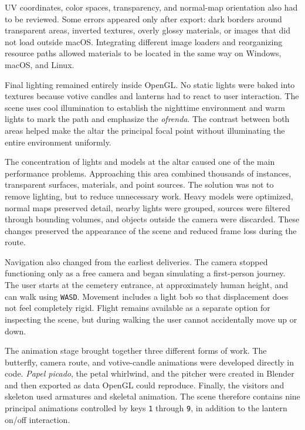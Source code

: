 \documentclass[letter,12pt]{article}
\begin{document}
	UV coordinates, color spaces, transparency, and normal-map orientation also had to be reviewed. Some errors appeared only after export: dark borders around transparent areas, inverted textures, overly glossy materials, or images that did not load outside macOS. Integrating different image loaders and reorganizing resource paths allowed materials to be located in the same way on Windows, macOS, and Linux.

	Final lighting remained entirely inside OpenGL. No static lights were baked into textures because votive candles and lanterns had to react to user interaction. The scene uses cool illumination to establish the nighttime environment and warm lights to mark the path and emphasize the \textit{ofrenda}. The contrast between both areas helped make the altar the principal focal point without illuminating the entire environment uniformly.

	The concentration of lights and models at the altar caused one of the main performance problems. Approaching this area combined thousands of instances, transparent surfaces, materials, and point sources. The solution was not to remove lighting, but to reduce unnecessary work. Heavy models were optimized, normal maps preserved detail, nearby lights were grouped, sources were filtered through bounding volumes, and objects outside the camera were discarded. These changes preserved the appearance of the scene and reduced frame loss during the route.

	Navigation also changed from the earliest deliveries. The camera stopped functioning only as a free camera and began simulating a first-person journey. The user starts at the cemetery entrance, at approximately human height, and can walk using \texttt{WASD}. Movement includes a light bob so that displacement does not feel completely rigid. Flight remains available as a separate option for inspecting the scene, but during walking the user cannot accidentally move up or down.

	The animation stage brought together three different forms of work. The butterfly, camera route, and votive-candle animations were developed directly in code. \textit{Papel picado}, the petal whirlwind, and the pitcher were created in Blender and then exported as data OpenGL could reproduce. Finally, the visitors and skeleton used armatures and skeletal animation. The scene therefore contains nine principal animations controlled by keys \texttt{1} through \texttt{9}, in addition to the lantern on/off interaction.
\end{document}
